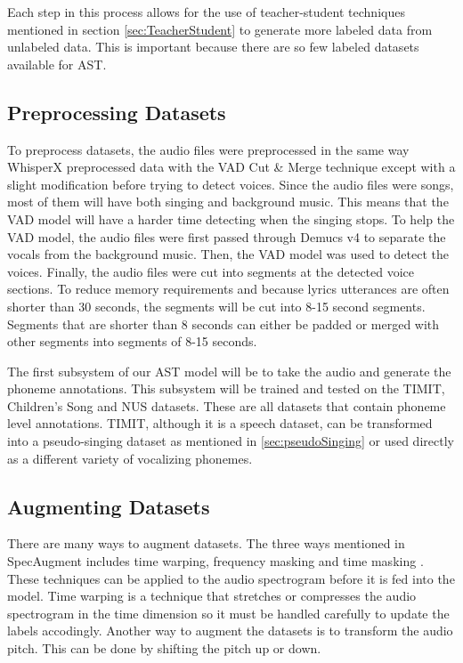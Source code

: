 \documentclass[letterpaper, 12pt]{article}
\begin{document}
\begin{multicols*}{2}
Each step in this process allows for the use of teacher-student techniques mentioned in section
\ref{sec:TeacherStudent} to generate more labeled data from unlabeled data. This is important
because there are so few labeled datasets available for AST.

\subsection{Preprocessing Datasets}
To preprocess datasets, the audio files were preprocessed in the same way WhisperX preprocessed
data with the VAD Cut \& Merge technique \citep{whisperX} except with a slight modification before
trying to detect voices. Since the audio files were songs, most of them will have both singing and
background music. This means that the VAD model will have a harder time detecting when the singing
stops. To help the VAD model, the audio files were first passed through Demucs v4 \citep{Demucs}
to separate the vocals from the background music. Then, the VAD model was used to detect the
voices. Finally, the audio files were cut into segments at the detected voice sections. To reduce
memory requirements and because lyrics utterances are often shorter than 30 seconds, the segments
will be cut into 8-15 second segments. Segments that are shorter than 8 seconds can either be padded
or merged with other segments into segments of 8-15 seconds.

The first subsystem of our AST model will be to take the audio and generate the phoneme annotations.
This subsystem will be trained and tested on the TIMIT, Children's Song and NUS datasets. These are
all datasets that contain phoneme level annotations. TIMIT, although it is a speech dataset, can be
transformed into a pseudo-singing dataset as mentioned in \ref{sec:pseudoSinging} or used directly
as a different variety of vocalizing phonemes.

\subsection{Augmenting Datasets}
There are many ways to augment datasets. The three ways mentioned in SpecAugment includes
time warping, frequency masking and time masking \citep{SpecAugment}. These techniques can be
applied to the audio spectrogram before it is fed into the model. Time warping is a technique that
stretches or compresses the audio spectrogram in the time dimension so it must be handled carefully
to update the labels accodingly. Another way to augment the datasets is to transform the audio
pitch. This can be done by shifting the pitch up or down.


\end{multicols*}
\end{document}

